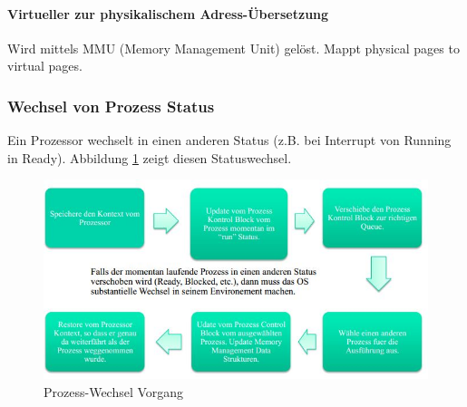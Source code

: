 \paragraph{Virtueller zur physikalischem Adress-Übersetzung}
Wird mittels MMU (Memory Management Unit) gelöst. Mappt physical pages to virtual pages. \\

\subsubsection{Wechsel von Prozess Status}
Ein Prozessor wechselt in einen anderen Status (z.B. bei Interrupt von Running in Ready). Abbildung \ref{fig:system-software-prozess-wechsel} zeigt diesen Statuswechsel.

\begin{figure}[h!]
\centering
\includegraphics[width=0.7\linewidth]{fig/system-software-prozess-wechsel}
\caption{Prozess-Wechsel Vorgang}
\label{fig:system-software-prozess-wechsel}
\end{figure}

